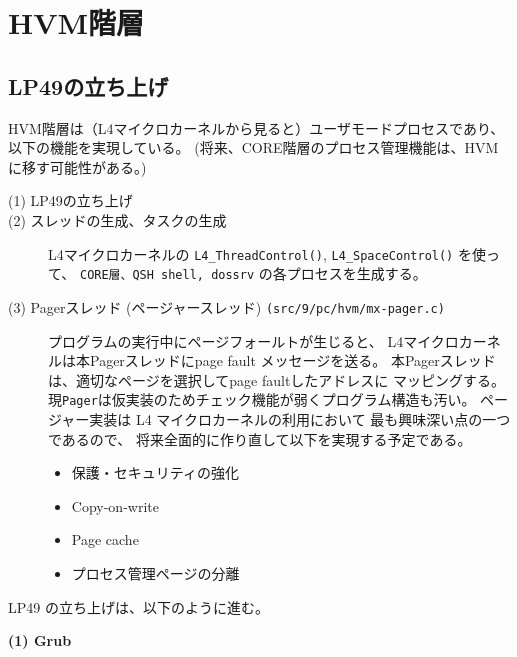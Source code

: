 \part{HVM階層}

\chapter{LP49の立ち上げ}

  HVM階層は（L4マイクロカーネルから見ると）ユーザモードプロセスであり、
以下の機能を実現している。
   (将来、CORE階層のプロセス管理機能は、HVMに移す可能性がある。)

\begin{description} 

\item[(1) LP49の立ち上げ]

\item[(2) スレッドの生成、タスクの生成]
      L4マイクロカーネルの \verb$L4_ThreadControl()$, \verb$L4_SpaceControl()$ を使って、
    {\tt CORE層、QSH shell, dossrv}
    の各プロセスを生成する。

\item[(3) Pagerスレッド (ページャースレッド)  {\tt (src/9/pc/hvm/mx-pager.c)} ]
      プログラムの実行中にページフォールトが生じると、
      L4マイクロカーネルは本Pagerスレッドにpage fault メッセージを送る。
      本Pagerスレッドは、適切なページを選択してpage faultしたアドレスに
      マッピングする。
      現{\tt Pager}は仮実装のためチェック機能が弱くプログラム構造も汚い。
      ページャー実装は L4 マイクロカーネルの利用において
      最も興味深い点の一つであるので、
      将来全面的に作り直して以下を実現する予定である。
      \begin{itemize}
      \item  保護・セキュリティの強化
      \item  Copy-on-write
      \item  Page cache
      \item  プロセス管理ページの分離
      \end{itemize}

\end{description}

    

LP49 の立ち上げは、以下のように進む。

{\bf\flushleft (1) Grub}

